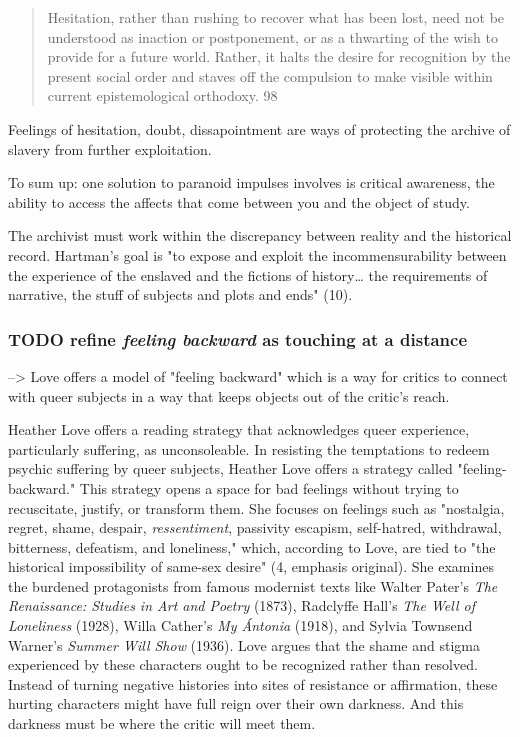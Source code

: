 \documentclass[11pt]{article}
\begin{document}
\begin{quote}
Hesitation, rather than rushing to recover what has been
lost, need not be understood as inaction or postponement, or as a
thwarting of the wish to provide for a future world. Rather, it halts
the desire for recognition by the present social order and staves off
the compulsion to make visible within current epistemological
orthodoxy. 98
\end{quote}

Feelings of hesitation, doubt, dissapointment are ways of protecting
the archive of slavery from further exploitation.

To sum up: one solution to paranoid impulses involves is critical
awareness, the ability to access the affects that come between you and
the object of study. 

The archivist must work within the discrepancy between reality and the
historical record. Hartman's goal is "to expose and exploit the
incommensurability between the experience of the enslaved and the
fictions of history\ldots{} the requirements of narrative, the stuff of
subjects and plots and ends" (10).
\subsubsection{{\bfseries\sffamily TODO} refine \emph{feeling backward} as touching at a distance}
\label{sec:orgc3f6848}
--> Love offers a model of "feeling backward" which is a way for critics
to connect with queer subjects in a way that keeps objects out of the
critic's reach. 

Heather Love offers a reading strategy that acknowledges queer
experience, particularly suffering, as unconsoleable. In resisting the
temptations to redeem psychic suffering by queer subjects, Heather
Love offers a strategy called "feeling-backward." This strategy opens
a space for bad feelings without trying to recuscitate, justify, or
transform them. She focuses on feelings such as "nostalgia, regret,
shame, despair, \emph{ressentiment}, passivity escapism, self-hatred,
withdrawal, bitterness, defeatism, and loneliness," which, according
to Love, are tied to "the historical impossibility of same-sex desire"
(4, emphasis original). She examines the burdened protagonists from
famous modernist texts like Walter Pater's \emph{The Renaissance: Studies
in Art and Poetry} (1873), Radclyffe Hall's \emph{The Well of Loneliness}
(1928), Willa Cather's \emph{My Ántonia} (1918), and Sylvia Townsend
Warner's \emph{Summer Will Show} (1936). Love argues that the shame and
stigma experienced by these characters ought to be recognized rather
than resolved. Instead of turning negative histories into sites of
resistance or affirmation, these hurting characters might have full
reign over their own darkness. And this darkness must be where the
critic will meet them.
\end{document}
